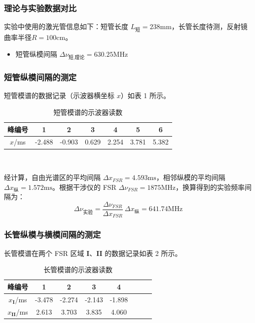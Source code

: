 \documentclass[a4paper, 1.5lines]{ctexart}
\begin{document}
\subsubsection{理论与实验数据对比}

实验中使用的激光管信息如下：短管长度 $L_{\text{短}} = 238 \mathrm{mm}$，长管长度待测，反射镜曲率半径$R = 100 \mathrm{cm}$。
\begin{itemize}
    \item 短管纵模间隔 $\Delta \nu_{\text{短}, \text{理论}} = 630.25 \mathrm{MHz}$
\end{itemize}

\subsubsection{短管纵模间隔的测定}

短管模谱的数据记录（示波器横坐标 $x$）如表 1 所示。

\begin{table}[h!]
    \centering
    \caption{短管模谱的示波器读数}
    \begin{tabular}{ccccccc}
        \toprule
        峰编号 & 1 & 2 & 3 & 4 & 5 & 6 \\
        \midrule
        $x$/ms & -2.488 & -0.903 & 0.629 & 2.254 & 3.781 & 5.382 \\
        \bottomrule
    \end{tabular}        
    \label{tab:short_data}
\end{table}

经计算，自由光谱区的平均间隔 $\Delta x_{FSR} = 4.593 \mathrm{ms}$，相邻纵模的平均间隔 $\Delta x_{\text{纵}} = 1.572 \mathrm{ms}$。根据干涉仪的 FSR $\Delta \nu_{FSR} = 1875 \mathrm{MHz}$，换算得到的实验频率间隔为：
$$
\Delta \nu_{\text{实验}} = \dfrac{\Delta \nu_{FSR}}{\Delta x_{FSR}}\ \Delta x_{\text{纵}} = 641.74 \mathrm{MHz}
$$


\subsubsection{长管纵模与横模间隔的测定}

长管模谱在两个 FSR 区域 $\mathbf{I}$、$\mathbf{II}$ 的数据记录如表 2 所示。

\begin{table}[h!]
    \centering
    \caption{长管模谱的示波器读数}
    \begin{tabular}{cccccccc}
        \toprule
        峰编号 & 1 & 2 & 3 & 4  \\
        \midrule
        $x_\mathbf{I}$/ms & -3.478 & -2.274 & -2.143 & -1.898  \\
        $x_\mathbf{II}$/ms & 2.613 & 3.703 & 3.835 & 4.060  \\
        \bottomrule
    \end{tabular}
    \label{tab:long_data}
\end{table}
\end{document}
